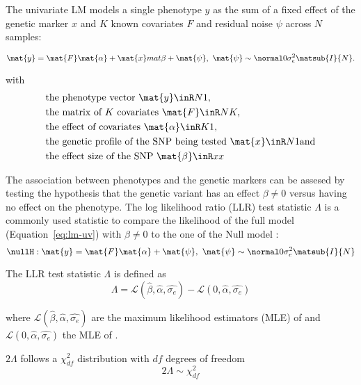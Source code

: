 The univariate LM models a single phenotype \(y\) as the sum of a fixed effect of the genetic marker \(x\) and \(K\) known covariates \(F\) and residual noise \(\psi\) across \(N\) samples:

\begin{equation}
\mat{y} = \mat{F}\mat{\alpha} + \mat{x}mat{\beta} + \mat{\psi},\text{ }
\mat{\psi} \sim \normal 0 {\sigma_e^2\matsub{I}{N}}.
\label{eq:lm-uv}
\end{equation}

with
\begin{align*} 
& \text{the phenotype vector } \mat{y} \inR N 1,\\
& \text{the matrix of $K$ covariates }\mat{F} \inR N K,\\
& \text{the effect of covariates } \mat{\alpha} \inR K 1,\\
& \text{the genetic profile of the SNP being tested }\mat{x} \inR N 1 \text{and}\\
& \text{the effect size of the SNP } \mat{\beta} \inR x x \\
\end{align*} 


\noindent The association between phenotypes and the genetic markers can be assesed by testing the hypothesis that the genetic variant has an effect \(\beta \neq 0\) versus having no effect on the phenotype. The log likelihood ratio (LLR) test statistic \(\Lambda\) is a commonly used statistic to compare the likelihood of the full model \taltH (Equation~\ref{eq:lm-uv}) with \(\beta \neq 0\) to the one of the Null model \tnullH:
\begin{equation}
\nullH: \mat{y} =\mat{F}\mat{\alpha}  + \mat{\psi},\text{ }
\mat{\psi}\sim \normal 0 {\sigma_e^2\matsub{I}{N}}
\label{eq:lm_null}
\end{equation}

\noindent The LLR test statistic \(\Lambda\) is defined as
\begin{equation}
\Lambda  =  \mathcal{L} (\hat{\beta}, \hat{\alpha}, \hat{\sigma_{e}}) -  \mathcal{L} (0, \hat{\alpha}, \hat{\sigma_{e}})
\label{eq:llr}
\end{equation}

\noindent where \(\mathcal{L} (\hat{\beta}, \hat{\alpha}, \hat{\sigma_{e}})\) are the maximum likelihood estimators (MLE) of  \taltH and \(\mathcal{L} (0, \hat{\alpha}, \hat{\sigma_{e}})\) the MLE of \tnullH. 

\noindent \(2\Lambda\) follows a \(\chi^2_{df}\) distribution with \(df\) degrees of freedom \citep{Wilks1938} 
\begin{equation}
2\Lambda \sim \chi^2_{df} 
\label{eq:lambda}
\end{equation}

